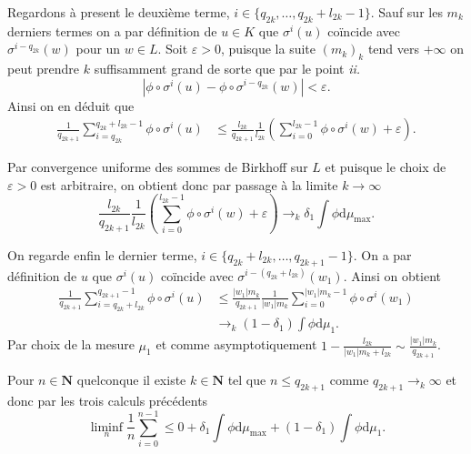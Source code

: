 \documentclass[12pt]{article}
\newcommand{\N}{\mathbf{N}}
\newcommand{\de}{\mathrm{d}}
\begin{document}
Regardons à present le deuxième terme, $i \in \{q_{2k}, \ldots, q_{2k} +l_{2k}-1\}$. Sauf sur les $m_{k}$ derniers termes on a par définition de $u \in K$ que $\sigma^{i}(u)$ coïncide avec $\sigma^{i - q_{2k}}(w)$ pour un $w \in L$. Soit $\varepsilon > 0$, puisque la suite $(m_{k})_{k}$ tend vers $+\infty$ on peut prendre $k$ suffisamment grand de sorte que par le point \textit{ii.}  \[
        |\phi\circ\sigma^{i}(u) - \phi\circ\sigma^{i-q_{2k}}(w)| < \varepsilon
.\]  
Ainsi on en déduit que 
\begin{align*}
        \frac{1}{q_{2k+1}}\sum_{i=q_{2k}}^{q_{2k}+l_{2k}-1} \phi\circ\sigma^{i}(u) &\le \frac{l_{2k}}{q_{2k+1}}\frac{1}{l_{2k}}(\sum_{i=0}^{l_{2k}-1} \phi\circ\sigma^{i}(w) + \varepsilon) 
.\end{align*}

Par convergence uniforme des sommes de Birkhoff sur $L$ et puisque le choix de $\varepsilon > 0$ est arbitraire, on obtient donc par passage à la limite $k \to \infty$ \[
\frac{l_{2k}}{q_{2k+1}}\frac{1}{l_{2k}}(\sum_{i=0}^{l_{2k}-1} \phi\circ\sigma^{i}(w) + \varepsilon) \to_{k} \delta_{1}\int\phi\de\mu_{\max} 
.\] 

On regarde enfin le dernier terme, $i \in \{q_{2k}+l_{2k}, \ldots, q_{2k+1}-1\}$. On a par définition de $u$ que $\sigma^{i}(u)$ coïncide avec $\sigma^{i-(q_{2k}+l_{2k})}(w_1)$. Ainsi on obtient
\begin{align*}
        \frac{1}{q_{2k+1}}\sum_{i=q_{2k}+l_{2k}}^{q_{2k+1}-1} \phi\circ\sigma^{i}(u) &\le \frac{|w_{1}|m_{k}}{q_{2k+1}}\frac{1}{|w_{1}|m_{k}}\sum_{i=0}^{|w_{1}|m_{k}-1} \phi\circ\sigma^{i}(w_{1}) \\
                                                                                     &\to_{k}(1-\delta_{1})\int\phi\de\mu_{1}
.\end{align*}
Par choix de la mesure $\mu_{1}$ et comme asymptotiquement $1-\frac{l_{2k}}{|w_{1}|m_{k}+l_{2k}} \sim \frac{|w_{1}|m_{k}}{q_{2k+1}}$.

\medskip

Pour $n \in \N$ quelconque il existe $k \in \N$ tel que $n \le q_{2k+1}$ comme $q_{2k+1}\to_{k} \infty$ et donc par les trois calculs précédents \[
        \liminf_{n}\frac{1}{n}\sum_{i=0}^{n-1} \le 0 + \delta_{1}\int\phi\de\mu_{\max} + (1-\delta_{1})\int\phi\de\mu_{1}
.\]  

\medskip
\end{document}
